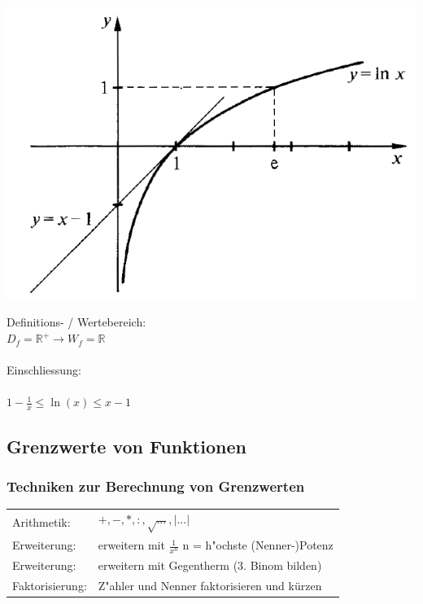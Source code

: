 			\begin{minipage}{.45\linewidth}
				\includegraphics[width=0.95\linewidth]{Bilder/ln-funktion}
			\end{minipage}
				\hfill
			\begin{minipage}{.5\linewidth}
				Definitions- / Wertebereich: \\
				$D_f = \mathbb{R^+} \rightarrow W_f = \mathbb{R}$ \\
				\\
				Einschliessung: \\
				\\
				$1-\frac{1}{x} \leq \ln(x) \leq x-1$
			\end{minipage}
				
	\subsection{Grenzwerte von Funktionen}
			
		\subsubsection{Techniken zur Berechnung von Grenzwerten}	
			\begin{tabular}{ll}
				Arithmetik: & $+, -, *, :, \sqrt{...}, \vert ...\vert$ \\
				Erweiterung:& erweitern mit $\frac{1}{x^n}$ n = h"ochste (Nenner-)Potenz \\
				Erweiterung: & erweitern mit Gegentherm (3. Binom bilden)\\
				Faktorisierung: & Z"ahler und Nenner faktorisieren und kürzen \\
			\end{tabular}
		
